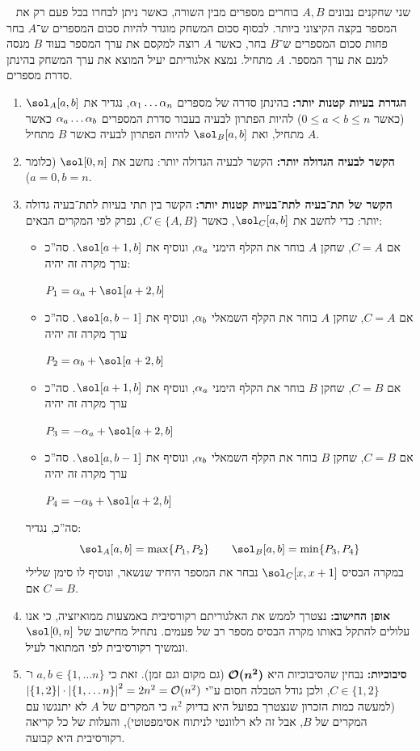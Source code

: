 \documentclass[]{../../../../tex/classes/homework}
\begin{document}
\npage%
	
	\ {}
	שני שחקנים נבונים $A, B$ בוחרים מספרים מבין השורה, כאשר ניתן לבחרו בכל פעם רק את המספר בקצה הקיצוני ביותר. לבסוף סכום המשחק מוגדר להיות סכום המספרים ש־$A$ בחר פחות סכום המספרים ש־$B$ בחר, כאשר $A$ רוצה למקסם את ערך המספר בעוד $B$ מנסה למנם את ערך המספר. $A$ מתחיל. נמצא אלגוריתם יעיל המוצא את ערך המשחק בהינתן סדרת מספרים. 
	\begin{enumerate}
		\item \textbf{הגדרת בעיות קטנות יותר: }בהינתן סדרה של מספרים $\alpha_1 \dots \alpha_n$, נגדיר את $\sol_A[a, b]$ (כאשר $0 \le a < b \le n$) להיות הפתרון לבעיה בעבור סדרת המספרים $\alpha_a \dots \alpha_b$ כאשר $A$ מתחיל, ואת $\sol_B[a, b]$ להיות הפתרון לבעיה כאשר $B$ מתחיל. 
		\item \textbf{הקשר לבעיה הגדולה יותר: }הקשר לבעיה הגדולה יותר: נחשב את $\sol[0, n]$ (כלומר $a = 0, b = n$). 
		\item \textbf{הקשר של תת־בעיה לתת־בעיות קטנות יותר: }הקשר בין תתי בעיות לתת־בעיה גדולה יותר: כדי לחשב את $\sol_C[a, b]$, כאשר $C \in \{A, B\}$, נפרק לפי המקרים הבאים: 
		\begin{itemize}
			\item אם $C = A$, שחקן $A$ בוחר את הקלף הימני $\alpha_{a}$, ונוסיף את $\sol[a + 1, b]$. סה''כ ערך מקרה זה יהיה: 
			
			\hfil $P_1 = \ag_{a} + \sol[a + 2, b]$
			\item אם $C = A$, שחקן $A$ בוחר את הקלף השמאלי $\alpha_{b}$, ונוסיף את $\sol[a, b - 1]$. סה''כ ערך מקרה זה יהיה
			
			\hfil $P_2 = \ag_{b} + \sol[a + 2, b]$
			\item אם $C = B$, שחקן $B$ בוחר את הקלף הימני $\alpha_{a}$, ונוסיף את $\sol[a + 1, b]$. סה''כ ערך מקרה זה יהיה
			
			\hfil $P_3 = - \ag_{a} + \sol[a + 2, b]$
			\item אם $C = B$, שחקן $B$ בוחר את הקלף השמאלי $\alpha_{b}$, ונוסיף את $\sol[a, b - 1]$. סה''כ ערך מקרה זה יהיה
			
			\hfil $P_4 = -\ag_{b} + \sol[a + 2, b]$
		\end{itemize}
		סה''כ, נגדיר: 
		\[ \sol_A[a, b] = \max\{P_1, P_2\} \quad\quad \sol_B[a, b] = \min\{P_3, P_4\} \]
		במקרה הבסיס $\sol_C[x, x + 1]$ נבחר את המספר היחיד שנשאר, ונוסיף לו סימן שלילי אם $C = B$. 
		\item \textbf{אופן החישוב: }נצטרך לממש את האלגוריתם רקורסיבית באמצעות ממואיזציה, כי אנו עלולים להתקל באותו מקרה הבסיס מספר רב של פעמים. נתחיל מחישוב של $\sol[0, n]$ ונמשיך רקורסיבית לפי המתואר לעיל. 
		\item \textbf{סיבוכיות: }נבחין שהסיבוכיות היא $\bm{\mathcal{O}(n^{2})}$ (גם מקום וגם זמן). זאת כי $a, b \in \{1, \dots n\}$ ו־$C \in \{1, 2\}$, ולכן גודל הטבלה חסום ע''י $\left \lvert \{1, 2\} \right \rvert \cdot \left \lvert \{1, \dots n\} \right \rvert^{2} = 2n^{2} = \mathcal{O}(n^{2})$ (למעשה כמות הזכרון שנצטרך בפועל היא בדיוק $n^{2}$ כי המקרים של $A$ לא יתנגשו עם המקרים של $B$, אבל זה לא רלוונטי לניתוח אסימפטוטי), והעלות של כל קריאה רקורסיבית היא קבועה. 
	\end{enumerate}
	
\end{document}

